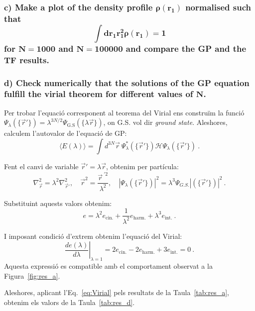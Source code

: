 \documentclass[a4paper]{article}
\begin{document}
\subsubsection*{c) Make a plot of the density profile $\boldsymbol{\rho (r_1)}$ normalised such that \begin{equation}
 \boldsymbol{\int dr_1 r_1^2 \rho(r_1)=1}
\end{equation} for $\mathbf{N=1000}$ and $\mathbf{N=100000}$ and compare the GP and the TF results.}




\subsubsection*{d) Check numerically that the solutions of the GP equation fulfill the virial theorem for different values of $\mathbf{N}$.}

Per trobar l'equació corresponent al teorema del Virial ens construïm la funció $\Psi_{\lambda}(\{\vec r'\})=\lambda^{3N/2}\Psi_{\text{G.S}}(\{\lambda\vec r\})$, on G.S. vol dir \textit{ground state}. Aleshores, calculem l'autovalor de l'equació de GP:
\begin{equation}
    \langle E(\lambda)\rangle=\int d^{3N}\vec r \ \Psi_{\lambda}^{*}(\{\vec r'\})\mathcal{H} \Psi_{\lambda}(\{\vec r'\}) \ .
\end{equation}

Fent el canvi de variable $\vec r'= \lambda\vec r$, obtenim per partícula: 
\begin{equation}
    \nabla^2_{\vec r}=\lambda^2\nabla^2_{\vec r'}, \quad \vec r^2=\dfrac{{\vec r}^{\ '2}}{\lambda^2}, \quad |\Psi_{\lambda}(\{\vec r'\})|^2=\lambda^3\Psi_{G.S.}|(\{\vec r'\})|^2 \ .
\end{equation}

Substituint aquests valors obtenim:
\begin{equation}
    e= \lambda^2 e_{\text{cin.}}+\dfrac{1}{\lambda^2}e_{\text{harm.}}+\lambda^3 e_{\text{int.}}\ .
\end{equation}

I imposant condició d'extrem obtenim l'equació del Virial:
\begin{equation}
    \left.\dfrac{de(\lambda)}{d\lambda}\right\vert_{\lambda=1}=2e_{\text{cin.}}-2e_{\text{harm.}}+3 e_{\text{int.}}=0\ .
\label{eq:Virial}
\end{equation}
Aquesta expressió es compatible amb el comportament observat a la Figura~\ref{fig:res_a}.

Aleshores, aplicant l'Eq.~\ref{eq:Virial} pels resultats de la Taula~\ref{tab:res_a}, obtenim els valors de la Taula~\ref{tab:res_d}.
\end{document}
